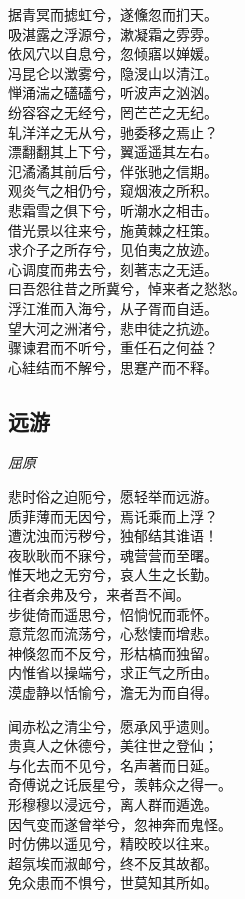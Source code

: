 \documentclass[]{article}
\begin{document}
据青冥而摅虹兮，遂儵忽而扪天。\\
吸湛露之浮源兮，漱凝霜之雰雰。\\
依风穴以自息兮，忽倾寤以婵媛。\\
冯昆仑以澂雾兮，隐渂山以清江。\\
惮涌湍之礚礚兮，听波声之汹汹。\\
纷容容之无经兮，罔芒芒之无纪。\\
轧洋洋之无从兮，驰委移之焉止？\\
漂翻翻其上下兮，翼遥遥其左右。\\
氾潏潏其前后兮，伴张驰之信期。\\
观炎气之相仍兮，窥烟液之所积。\\
悲霜雪之俱下兮，听潮水之相击。\\
借光景以往来兮，施黄棘之枉策。\\
求介子之所存兮，见伯夷之放迹。\\
心调度而弗去兮，刻著志之无适。\\
曰吾怨往昔之所冀兮，悼来者之悐悐。\\
浮江淮而入海兮，从子胥而自适。\\
望大河之洲渚兮，悲申徒之抗迹。\\
骤谏君而不听兮，重任石之何益？\\
心絓结而不解兮，思蹇产而不释。

\hypertarget{header-n124}{%
\subsection{远游}\label{header-n124}}

\emph{屈原}

悲时俗之迫阨兮，愿轻举而远游。\\
质菲薄而无因兮，焉讬乘而上浮？\\
遭沈浊而污秽兮，独郁结其谁语！\\
夜耿耿而不寐兮，魂营营而至曙。\\
惟天地之无穷兮，哀人生之长勤。\\
往者余弗及兮，来者吾不闻。\\
步徙倚而遥思兮，怊惝怳而乖怀。\\
意荒忽而流荡兮，心愁悽而增悲。\\
神倏忽而不反兮，形枯槁而独留。\\
内惟省以操端兮，求正气之所由。\\
漠虚静以恬愉兮，澹无为而自得。

闻赤松之清尘兮，愿承风乎遗则。\\
贵真人之休德兮，美往世之登仙；\\
与化去而不见兮，名声著而日延。\\
奇傅说之讬辰星兮，羡韩众之得一。\\
形穆穆以浸远兮，离人群而遁逸。\\
因气变而遂曾举兮，忽神奔而鬼怪。\\
时仿佛以遥见兮，精晈晈以往来。\\
超氛埃而淑邮兮，终不反其故都。\\
免众患而不惧兮，世莫知其所如。
\end{document}
